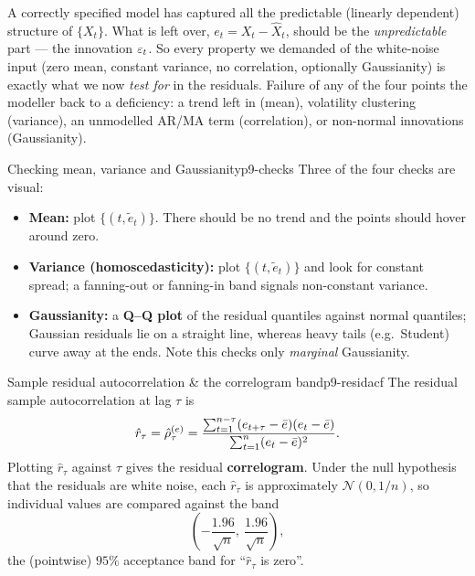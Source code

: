 \begin{intuition}
A correctly specified model has captured all the predictable (linearly
dependent) structure of $\{X_t\}$. What is left over, $e_t=X_t-\hat X_t$, should
be the \emph{unpredictable} part --- the innovation $\varepsilon_t$. So every property
we demanded of the white-noise input (zero mean, constant variance, no
correlation, optionally Gaussianity) is exactly what we now \emph{test for} in
the residuals. Failure of any of the four points the modeller back to a
deficiency: a trend left in (mean), volatility clustering (variance), an
unmodelled AR/MA term (correlation), or non-normal innovations (Gaussianity).
\end{intuition}

\begin{definition}{Checking mean, variance and Gaussianity}{p9-checks}
Three of the four checks are visual:
\begin{itemize}
  \item \textbf{Mean:} plot $\{(t,\tilde e_t)\}$. There should be no trend and
        the points should hover around zero.
  \item \textbf{Variance (homoscedasticity):} plot $\{(t,\tilde e_t)\}$ and
        look for constant spread; a fanning-out or fanning-in band signals
        non-constant variance.
  \item \textbf{Gaussianity:} a \textbf{Q--Q plot} of the residual quantiles
        against normal quantiles; Gaussian residuals lie on a straight line,
        whereas heavy tails (e.g.\ Student) curve away at the ends. Note this
        checks only \emph{marginal} Gaussianity.
\end{itemize}
\end{definition}

\begin{definition}{Sample residual autocorrelation \& the correlogram band}{p9-residacf}
The residual sample autocorrelation at lag $\tau$ is
\[
\hat r_\tau = \hat{\rho}^{(e)}_\tau
= \frac{\sum_{t=1}^{n-\tau}(e_{t+\tau}-\bar e)(e_t-\bar e)}
       {\sum_{t=1}^{n}(e_t-\bar e)^2 }.
\]
Plotting $\hat r_\tau$ against $\tau$ gives the residual \textbf{correlogram}.
Under the null hypothesis that the residuals are white noise, each $\hat r_\tau$
is approximately $\mathcal N(0,1/n)$, so individual values are compared against
the band
\[
\left(-\frac{1.96}{\sqrt n},\ \frac{1.96}{\sqrt n}\right),
\]
the (pointwise) $95\%$ acceptance band for ``$\hat r_\tau$ is zero''.
\end{definition}

